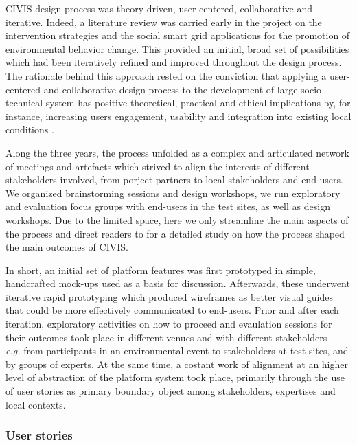 CIVIS design process was theory-driven, user-centered, collaborative and iterative. Indeed, a
literature review was carried early in the project on the intervention strategies and the social smart
grid applications for the promotion of environmental behavior change. This provided an initial, broad set
of possibilities which had been iteratively refined and improved throughout the design process.
The rationale behind this approach rested on the conviction that applying a user-centered and
collaborative design process to the development of large socio-technical system has positive
theoretical, practical and ethical implications \cite{Greenbaum1993,Boedker2004} by, for instance, increasing users engagement,
usability and integration into existing local conditions \cite{Brynjarsdottir2012,Dick2012,Pierce2012}.

Along the three years, the process unfolded as a complex and articulated network of meetings and artefacts
which strived to align the interests of different stakeholders involved, from porject partners to
local stakeholders and end-users. We organized brainstorming sessions and design workshops, we run
exploratory and evaluation focus groups with end-users in the test sites, as well as design workshops.
Due to the limited space, here we only streamline the main aspects of the process and direct readers to
\cite{poderi_disentangling_2017} for a detailed study on how the process shaped the main
outcomes of CIVIS. %

In short, an initial set of platform features was first prototyped in simple, handcrafted mock-ups
used as a basis for discussion. Afterwards, these underwent iterative rapid prototyping which
produced wireframes as better visual guides that could be more effectively communicated to end-users.
Prior and after each iteration, exploratory activities on how to proceed and evaulation sessions for their outcomes
took place in different venues and with different stakeholders -- \textit{e.g.} from participants in an environmental event \cite{Barssi2015} to
stakeholders at test sites, and by groups of experts. At the same time, a costant work of alignment at an higher level of
abstraction of the platform system took place, primarily through the use of user stories as primary boundary object among stakeholders,
expertises and local contexts.

\subsubsection{User stories}

